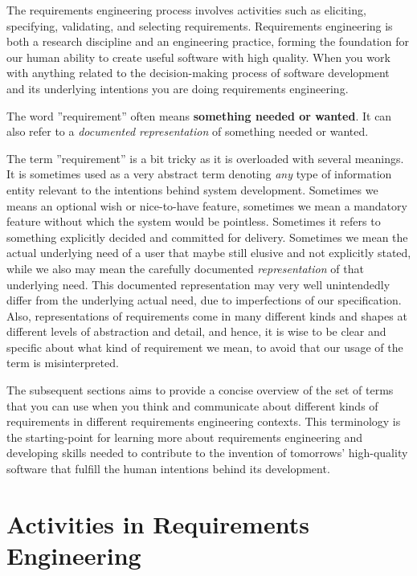 \documentclass[a4paper,11pt,oneside]{book}
\begin{document}
The requirements engineering process involves activities such as eliciting, specifying, validating, and selecting requirements. 
Requirements engineering is both a research discipline and an engineering practice, forming the foundation for our human ability to create useful software with high quality. When you work with anything related to the decision-making process of software development and its underlying intentions you are doing requirements engineering.

The word ''requirement'' often means \textbf{something needed or wanted}. It can also refer to a \emph{documented representation} of something needed or wanted. 

The term ''requirement'' is a bit tricky as it is overloaded with several meanings. It is sometimes used as a very abstract term denoting \textit{any} type of information entity relevant to the intentions behind system development.  Sometimes we means an optional wish or nice-to-have feature, sometimes we mean a mandatory feature without which the system would be pointless. Sometimes it refers to something explicitly decided and committed for delivery. Sometimes we mean the actual underlying need of a user that maybe still elusive and not explicitly stated, while we also may mean the carefully documented \textit{representation} of that underlying need. This documented representation may very well unintendedly differ from the underlying actual need, due to imperfections of our specification. 
Also, representations of requirements come in many different kinds and shapes at different levels of abstraction and detail, and hence, it is wise to be clear and specific about what kind of requirement we mean, to avoid that our usage of the term is misinterpreted. 

The subsequent sections aims to provide a concise overview of the set of terms that you can use when you think and communicate about different kinds of requirements in different requirements engineering contexts. This terminology is the starting-point for learning more about requirements engineering and developing skills needed to contribute to the invention of tomorrows' high-quality software that fulfill the human intentions behind its development.

\section{Activities in Requirements Engineering}
\end{document}
